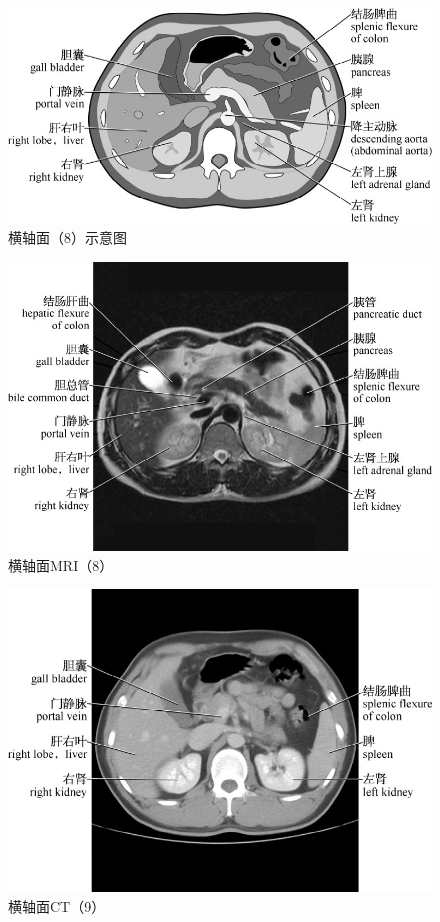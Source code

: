 \begin{figure}[!htbp]
 \centering
 \includegraphics{./images/Image00025.jpg}
 \captionsetup{justification=centering}
 \caption{横轴面（8）示意图}
  \end{figure} 
 \FloatBarrier

\begin{figure}[!htbp]
 \centering
 \includegraphics{./images/Image00026.jpg}
 \captionsetup{justification=centering}
 \caption{横轴面MRI（8）}
  \end{figure} 
 \FloatBarrier

\begin{figure}[!htbp]
 \centering
 \includegraphics{./images/Image00027.jpg}
 \captionsetup{justification=centering}
 \caption{横轴面CT（9）}
  \end{figure} 
 \FloatBarrier

